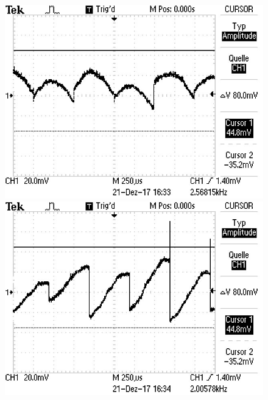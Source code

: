 \begin{figure}
\vspace{2em}
\begin{minipage}{0.48\textwidth}
\centering
{}
\includegraphics[scale=0.75]{content/images/noise90.jpg}
\end{minipage}
\begin{minipage}{0.48\textwidth}
\centering
{}
\includegraphics[scale=0.75]{content/images/noise180.jpg}
\end{minipage}


\end{figure}
